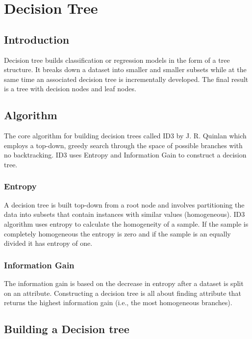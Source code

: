 \hypertarget{decision-tree}{%
\chapter{Decision Tree}\label{decision-tree}}
\section{Introduction}
Decision tree builds classification or regression models in the form of
a tree structure. It breaks down a dataset into smaller and smaller
subsets while at the same time an associated decision tree is
incrementally developed. The final result is a tree with decision nodes
and leaf nodes.

\hypertarget{algorithm}{%
\section{Algorithm}\label{algorithm}}

The core algorithm for building decision trees called ID3 by J. R.
Quinlan which employs a top-down, greedy search through the space of
possible branches with no backtracking. ID3 uses Entropy and Information
Gain to construct a decision tree.

\hypertarget{entropy}{%
\subsection{Entropy}\label{entropy}}

A decision tree is built top-down from a root node and involves
partitioning the data into subsets that contain instances with similar
values (homogeneous). ID3 algorithm uses entropy to calculate the
homogeneity of a sample. If the sample is completely homogeneous the
entropy is zero and if the sample is an equally divided it has entropy
of one.

\hypertarget{information-gain}{%
\subsection{Information Gain}\label{information-gain}}

The information gain is based on the decrease in entropy after a dataset
is split on an attribute. Constructing a decision tree is all about
finding attribute that returns the highest information gain (i.e., the
most homogeneous branches).

\hypertarget{building-a-decision-tree}{%
\section{Building a Decision tree}\label{building-a-decision-tree}}

